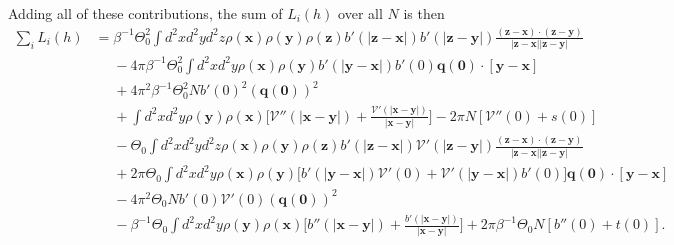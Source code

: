 \documentclass{article}
\begin{document}
Adding all of these contributions, the sum of $L_i(h)$ over all $N$ is then
\begin{align}
  \sum_i L_i(h)
  &=\beta^{-1}\Theta_0^2\int d^2xd^2yd^2z\rho(\bm{x})\rho(\bm{y})
    \rho(\bm{z})b'(|\bm{z}-\bm{x}|)b'(|\bm{z}-\bm{y}|)
    \frac{(\bm{z}-\bm{x})\cdot(\bm{z}-\bm{y})}{|\bm{z}-\bm{x}||\bm{z}-\bm{y}|}\nonumber\\
  &\phantom{=}-4\pi\beta^{-1}\Theta_0^2\int d^2xd^2y\rho(\bm{x})\rho(\bm{y})
    b'(|\bm{y}-\bm{x}|)b'(0)\bm{q}(\bm{0})\cdot[\bm{y}-\bm{x}]\nonumber\\
  &\phantom{=}+4\pi^2\beta^{-1}\Theta_0^2Nb'(0)^2(\bm{q}(\bm{0}))^2\nonumber\\
  &\phantom{=}+\int d^2xd^2y\rho(\bm{y})\rho(\bm{x})
    \bigg[\mathcal{V}''(|\bm{x}-\bm{y}|)
    +\frac{\mathcal{V}'(|\bm{x}-\bm{y}|)}{|\bm{x}-\bm{y}|}\bigg]
    -2\pi N[\mathcal{V}''(0)+s(0)]\nonumber\\
  &\phantom{=}
    -\Theta_0\int d^2xd^2yd^2z\rho(\bm{x})\rho(\bm{y})
    \rho(\bm{z})b'(|\bm{z}-\bm{x}|)\mathcal{V}'(|\bm{z}-\bm{y}|)
    \frac{(\bm{z}-\bm{x})\cdot(\bm{z}-\bm{y})}{|\bm{z}-\bm{x}||\bm{z}-\bm{y}|}\nonumber\\
  &\phantom{=}+2\pi\Theta_0\int d^2xd^2y\rho(\bm{x})\rho(\bm{y})
    \bigg[b'(|\bm{y}-\bm{x}|)\mathcal{V}'(0)+\mathcal{V}'(|\bm{y}-\bm{x}|)b'(0)\bigg]
    \bm{q}(\bm{0})\cdot[\bm{y}-\bm{x}]\nonumber\\
  &\phantom{=}-4\pi^2\Theta_0Nb'(0)\mathcal{V}'(0)(\bm{q}(\bm{0}))^2\nonumber\\
  &\phantom{=}-\beta^{-1}\Theta_0\int d^2xd^2y\rho(\bm{y})\rho(\bm{x})
    \bigg[b''(|\bm{x}-\bm{y}|)
    +\frac{b'(|\bm{x}-\bm{y}|)}{|\bm{x}-\bm{y}|}\bigg]
    +2\pi\beta^{-1}\Theta_0 N[b''(0)+t(0)].
\end{align}
\end{document}
